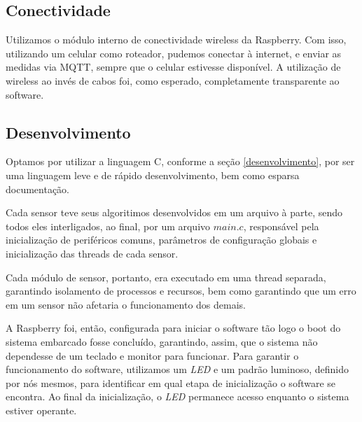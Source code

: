 \documentclass[twocolumn,11pt]{article}
\begin{document}
{\subsection{Conectividade}\label{sw_conectividade}
Utilizamos o módulo interno de conectividade wireless da Raspberry. Com isso, utilizando um celular como roteador, pudemos conectar à internet, e enviar as medidas via MQTT, sempre que o celular estivesse disponível. A utilização de wireless ao invés de cabos foi, como esperado, completamente transparente ao software.\par

\subsection{Desenvolvimento}\label{sw_desenvolvimento}
Optamos por utilizar a linguagem C, conforme a seção \ref{desenvolvimento}, por ser uma linguagem leve e de rápido desenvolvimento, bem como esparsa documentação.\par
Cada sensor teve seus algoritimos desenvolvidos em um arquivo à parte, sendo todos eles interligados, ao final, por um arquivo $main.c$, responsável pela inicialização de periféricos comuns, parâmetros de configuração globais e inicialização das threads de cada sensor.\par
Cada módulo de sensor, portanto, era executado em uma thread separada, garantindo isolamento de processos e recursos, bem como garantindo que um erro em um sensor não afetaria o funcionamento dos demais.\par
A Raspberry foi, então, configurada para iniciar o software tão logo o boot do sistema embarcado fosse concluído, garantindo, assim, que o sistema não dependesse de um teclado e monitor para funcionar. Para garantir o funcionamento do software, utilizamos um \textit{LED} e um padrão luminoso, definido por nós mesmos, para identificar em qual etapa de inicialização o software se encontra. Ao final da inicialização, o \textit{LED} permanece acesso enquanto o sistema estiver operante.\par

}
\end{document}
